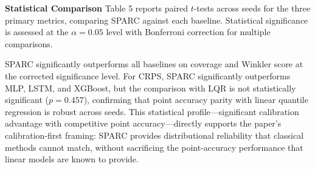 \documentclass[twoside]{article}
\begin{document}
\textbf{Statistical Comparison}
Table 5 reports paired $t$-tests across seeds for the three primary metrics, comparing SPARC against each baseline. Statistical significance is assessed at the $\alpha = 0.05$ level with Bonferroni correction for multiple comparisons.
\begin{table}[t]
\caption{Paired $t$-tests across seeds for the three primary metrics.}
\label{tab:5}
\centering
{}
\end{table}
SPARC significantly outperforms all baselines on coverage and Winkler score at the corrected significance level. For CRPS, SPARC significantly outperforms MLP, LSTM, and XGBoost, but the comparison with LQR is not statistically significant ($p = 0.457$), confirming that point accuracy parity with linear quantile regression is robust across seeds. This statistical profile---significant calibration advantage with competitive point accuracy---directly supports the paper's calibration-first framing: SPARC provides distributional reliability that classical methods cannot match, without sacrificing the point-accuracy performance that linear models are known to provide.
\end{document}
